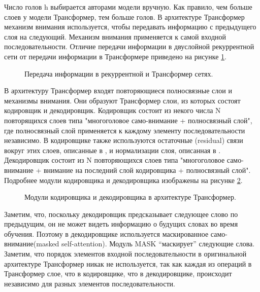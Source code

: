 Число голов h выбирается авторами модели вручную. Как правило, чем больше слоев у модели Трансформер, тем больше голов. 
В архитектуре Трансформер механизм внимания используется, чтобы передавать информацию с предыдущего слоя на следующий. Механизм внимания применяется к самой входной последовательности. Отличие передачи информации в двуслойной рекуррентной сети от передачи информации в Трансформере приведено на рисунке \ref{fig:Transformer3-CompareToRNN}. 


\begin{figure}[ht]
  \caption{Передача информации в рекуррентной и Трансформер сетях.}\label{fig:Transformer3-CompareToRNN}
\end{figure}


В архитектуру Трансформер входят повторяющиеся полносвязные слои и механизмы внимания. Они образуют Трансформер слои, из которых состоят кодировщик и декодировщик. Кодировщик состоит из некого числа N повторящихся слоев типа "многоголовое само-внимание + полносвязный слой", где полносвязный слой применяется к каждому элементу последовательности независимо. В кодировщике также используются остаточные (residual) связи вокруг этих слоев, описанные в \cite{he_2016}, и нормализации слоя, описанная в \cite{ba_2016}.
Декодировщик состоит из N повторяющихся слоев типа "многоголовое само-внимание + внимание на последний слой кодировщика + полносвязный слой". 
 Подробнее модули кодировщика и декодировщика изображены на рисунке \ref{fig:Transformer4-EncoderDecoder}. 

\begin{figure}[ht]
  \caption{Модули кодировщика и декодировщика в архитектуре Трансформер.}\label{fig:Transformer4-EncoderDecoder}
\end{figure}


 Заметим, что, поскольку декодировщик предсказывает следующее слово по предыдущим, он не может видеть информацию о будущих словах во время обучения. Поэтому в декодировщике используется маскированное само-внимание(masked self-attention). Модуль MASK “маскирует” следующие слова.
Заметим, что порядок элементов входной последовательности в оригинальной архитектуре Трансформер никак не используется, так как каждая из операций в Трансформер слое, что в кодировщике, что в декодировщике, происходит независимо для разных элементов последовательности. 

